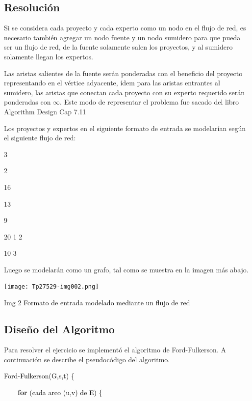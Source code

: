 \documentclass[a4paper,10pt]{article}
\begin{document}
\subsection{Resolución}

Si se considera cada proyecto y cada experto como un nodo en el flujo de red, es necesario también
agregar un nodo fuente y un nodo sumidero para que pueda ser un flujo de red, de la fuente solamente salen los proyectos, y al sumidero solamente llegan los expertos.

Las aristas salientes de la fuente serán ponderadas con el beneficio del proyecto representando en el
vértice adyacente, ídem para las aristas entrantes al sumidero, las aristas que conectan cada proyecto con su experto requerido serán ponderadas con \textcolor[rgb]{0.29803923,0.29803923,0.29803923}{${\infty}$}. Este
modo de representar el problema fue sacado del libro Algorithm Design Cap 7.11

Los proyectos y expertos en el siguiente formato de entrada se modelarían según el siguiente flujo de red:

\bigskip

3

2

16

13

9

20 1 2

10 3

\bigskip

Luego se modelarán como un grafo, tal como se muestra en la imagen más abajo.

\texttt{[image: Tp27529-img002.png]} 

{\centering
\textcolor{black}{Img 2 Formato de entrada modelado mediante un flujo de red}
\par}

\bigskip
\bigskip

\subsection {Diseño del Algoritmo}

Para resolver el ejercicio se implementó el algoritmo de Ford-Fulkerson. A continuación se describe el pseudocódigo del algoritmo.


\bigskip

\textcolor{black}{Ford}\textcolor[rgb]{0.4,0.4,0.4}{{}-}\textcolor{black}{Fulkerson(G,s,t) \{ }

\textcolor{black}{\ \ \ \ }\textbf{\textcolor[rgb]{0.0,0.5019608,0.0}{for}}\textcolor{black}{ (cada arco (u,v) de E) \{
}
\end{document}
